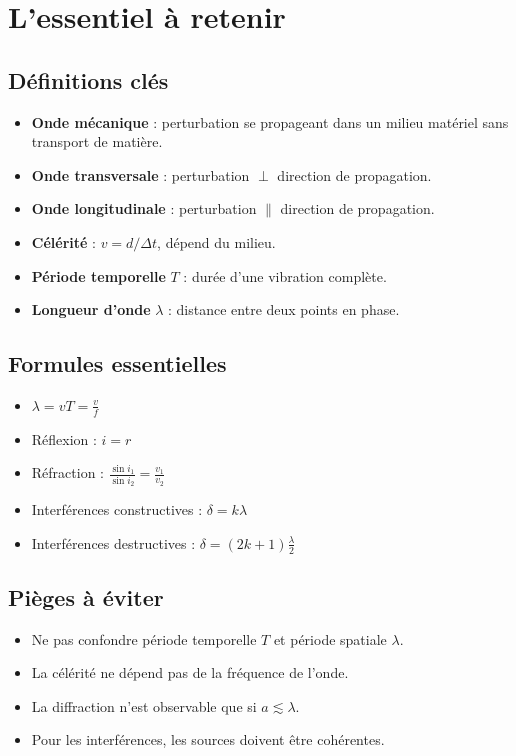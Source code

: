 \section{L'essentiel à retenir}

\begin{synthese}
\subsection*{Définitions clés}
\begin{itemize}
    \item \textbf{Onde mécanique} : perturbation se propageant dans un milieu matériel sans transport de matière.
    \item \textbf{Onde transversale} : perturbation $\perp$ direction de propagation.
    \item \textbf{Onde longitudinale} : perturbation $\parallel$ direction de propagation.
    \item \textbf{Célérité} : $v = d/\Delta t$, dépend du milieu.
    \item \textbf{Période temporelle} $T$ : durée d'une vibration complète.
    \item \textbf{Longueur d'onde} $\lambda$ : distance entre deux points en phase.
\end{itemize}

\subsection*{Formules essentielles}
\begin{itemize}
    \item $\boxed{\lambda = vT = \frac{v}{f}}$
    \item Réflexion : $\boxed{i = r}$
    \item Réfraction : $\boxed{\frac{\sin i_1}{\sin i_2} = \frac{v_1}{v_2}}$
    \item Interférences constructives : $\boxed{\delta = k\lambda}$
    \item Interférences destructives : $\boxed{\delta = (2k+1)\frac{\lambda}{2}}$
\end{itemize}

\subsection*{Pièges à éviter}
\begin{itemize}
    \item Ne pas confondre période temporelle $T$ et période spatiale $\lambda$.
    \item La célérité ne dépend pas de la fréquence de l'onde.
    \item La diffraction n'est observable que si $a \lesssim \lambda$.
    \item Pour les interférences, les sources doivent être cohérentes.
\end{itemize}
\end{synthese}

